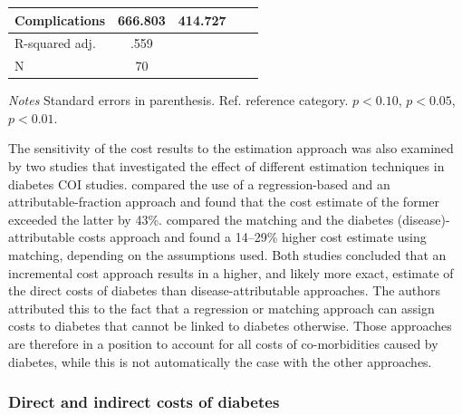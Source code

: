 \begin{table}[p]
\begin{center}
\begin{adjustbox}{max width=\linewidth}
\begin{threeparttable}
{\begin{tabular}{l*{2}{SS}}
                Complications & 666.803 & 414.727 \\
\midrule
                R-squared adj. & .559 &  \\
                N & 70 &  \\ 
 \bottomrule
\end{tabular}
\begin{tablenotes}
\item \footnotesize \textit{Notes} Standard errors in parenthesis. Ref. reference category.
\sym{*} \(p<0.10\), \sym{**} \(p<0.05\), \sym{***} \(p<0.01\).
\end{tablenotes}
}
\end{threeparttable}
\end{adjustbox}
\end{center}
\end{table}

The sensitivity of the cost results to the estimation approach was also examined by two studies that investigated the effect of different estimation techniques in diabetes \ac{COI} studies. \textcite{Honeycutt2009a} compared the use of a regression-based and an attributable-fraction approach and found that the cost estimate of the former exceeded the latter by 43\%. \textcite{Tunceli2010c} compared the matching and the diabetes (disease)-attributable costs approach and found a 14--29\% higher cost estimate using matching, depending on the assumptions used. Both studies concluded that an incremental cost approach results in a higher, and likely more exact, estimate of the direct costs of diabetes than disease-attributable approaches. The authors attributed this to the fact that a regression or matching approach can assign costs to diabetes that cannot be linked to diabetes otherwise. Those approaches are therefore in a position to account for all costs of co-morbidities caused by diabetes, while this is not automatically the case with the other approaches.

\subsubsection{Direct and indirect costs of diabetes}

